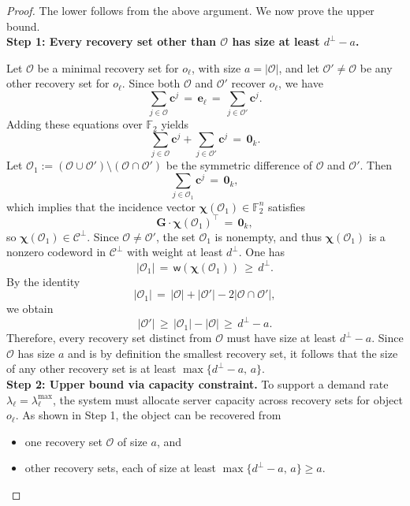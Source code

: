 \documentclass[conference,letterpaper]{IEEEtran}
\begin{document}
\begin{proof}
The lower follows from the above argument. We now prove the upper bound.
\\[2ex]
\textbf{Step 1: Every recovery set other than \( \mathcal{O} \) has size at least \( d^\perp - a \).}

Let \( \mathcal{O} \) be a minimal recovery set for \( o_\ell \), with size \( a = |\mathcal{O}| \), and let \( \mathcal{O}' \ne \mathcal{O} \) be any other recovery set for \( o_\ell \). Since both \( \mathcal{O} \) and \( \mathcal{O}' \) recover \( o_{\ell} \), we have
\[
\sum_{j \in \mathcal{O}} \boldsymbol{c}^j \,=\, \boldsymbol{e}_{\ell} \,=\, \sum_{j \in \mathcal{O}'} \boldsymbol{c}^j.
\]
Adding these equations over \( \mathbb{F}_2 \) yields
\[
\sum_{j \in \mathcal{O}} \boldsymbol{c}^j + \sum_{j \in \mathcal{O}'} \boldsymbol{c}^j \,=\, \boldsymbol{0}_k.
\]
Let \( \mathcal{O}_1 := (\mathcal{O} \cup \mathcal{O}') \setminus (\mathcal{O} \cap \mathcal{O}') \) be the symmetric difference of \( \mathcal{O} \) and \( \mathcal{O}' \). Then
\[
\sum_{j \in \mathcal{O}_1} \boldsymbol{c}^j \,=\, \boldsymbol{0}_k,
\]
which implies that the incidence vector \( \boldsymbol{\chi}(\mathcal{O}_1) \in \mathbb{F}_2^n \) satisfies
\[
\boldsymbol{G} \cdot \boldsymbol{\chi}(\mathcal{O}_1)^\top \,=\, \boldsymbol{0}_k,
\]
so \( \boldsymbol{\chi}(\mathcal{O}_1) \in \mathcal{C}^\perp \). Since \( \mathcal{O} \ne \mathcal{O}' \), the set \( \mathcal{O}_1 \) is nonempty, and thus \( \boldsymbol{\chi}(\mathcal{O}_1) \) is a nonzero codeword in \( \mathcal{C}^\perp \) with weight at least \( d^\perp \). One has
\[
|\mathcal{O}_1| \,=\, \textsf{w}(\boldsymbol{\chi}(\mathcal{O}_1)) \,\ge\, d^\perp.
\]
By the identity
\[
|\mathcal{O}_1| \,=\, |\mathcal{O}| + |\mathcal{O}'| - 2|\mathcal{O} \cap \mathcal{O}'|,
\]
we obtain
\[
|\mathcal{O}'| \,\ge\, |\mathcal{O}_1| - |\mathcal{O}| \,\ge\, d^\perp - a.
\]
Therefore, every recovery set distinct from \( \mathcal{O} \) must have size at least \( d^\perp - a \). Since \( \mathcal{O} \) has size \( a \) and is by definition the smallest recovery set, it follows that the size of any other recovery set is at least \( \max\{d^\perp - a,\, a\} \).
\\[2ex]
\textbf{Step 2: Upper bound via capacity constraint.}
To support a demand rate \( \lambda_{\ell} = \lambda_{\ell}^{\max} \), the system must allocate server capacity across recovery sets for object \( o_{\ell} \). As shown in Step 1, the object can be recovered from
\begin{itemize}
    \item one recovery set \( \mathcal{O} \) of size \( a \), and
    \item other recovery sets, each of size at least \( \max\{d^{\perp} - a,\, a\} \ge a \).
\end{itemize}


\end{proof}
\end{document}
